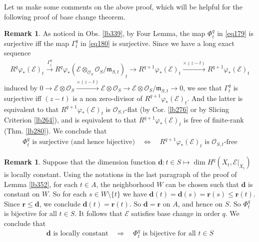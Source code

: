 \documentclass[12pt,b5paper,notitlepage]{report}
\theoremstyle{definition}
\newtheorem{rem}[df]{Remark}
\theoremstyle{plain}
\newcommand{\scr}{\mathscr}
\newcommand{\mbf}{\mathbf}
\newcommand{\mk}{\mathfrak m}
\numberwithin{equation}{section}
\begin{document}
Let us make some comments on the above proof, which will be helpful for the following proof of base change theorem.



\begin{rem}
As noticed in Obs. \ref{lb339}, by Four Lemma, the map $\Phi_t^q$ in \eqref{eq179} is surjective iff the map $\Gamma_t^q$ in \eqref{eq180} is surjective. Since we have a long exact sequence
\begin{align*}
R^q\varphi_*(\scr E)_t\xrightarrow{\Gamma_t^q}R^q\varphi_*(\scr E\otimes_{\scr O_S}\scr O_S/\mk_{S,t})_t \rightarrow R^{q+1}\varphi_*(\scr E)_t\xrightarrow {\times (z-t)}R^{q+1}\varphi_*(\scr E)_t
\end{align*}
induced by $0\rightarrow \scr E\otimes \scr O_S\xrightarrow{\times (z-t)}\scr E\otimes \scr O_S\rightarrow \scr E\otimes \scr O_S/\mk_{S,t}\rightarrow 0$, we see that $\Gamma_t^q$ is surjective iff $(z-t)$ is a non zero-divisor of $R^{q+1}\varphi_*(\scr E)_t$. And the latter is equivalent to that $R^{q+1}\varphi_*(\scr E)_t$ is $\scr O_{S,t}$-flat (by Cor. \ref{lb276} or by Slicing Criterion \ref{lb264}), and is equivalent to that $R^{q+1}\varphi_*(\scr E)_t$ is free of finite-rank (Thm. \ref{lb280}). We conclude that
\begin{align}
\Phi_t^q\text{ is surjective (and hence bijective)}\quad\Longleftrightarrow\quad R^{q+1}\varphi_*(\scr E)_t\text{ is $\scr O_{S,t}$-free}  \label{eq183}
\end{align}
\end{rem}



\begin{rem}
Suppose that the dimension function $\mbf d:t\in S\mapsto \dim H^q(X_t,\scr E|_{X_t})$ is locally constant. Using the notations in the last paragraph of the proof of Lemma \ref{lb352}, for each $t\in A$, the neighborhood $W$ can be chosen such that $\mbf d$ is constant on $W$. So for each $s\in W\setminus\{t\}$ we have $\mbf d(t)=\mbf d(s)=\mbf r (s)\leq\mbf r(t)$. Since $\mbf r\leq\mbf d$, we conclude $\mbf d(t)=\mbf r(t)$. So $\mbf d=\mbf r$ on $A$, and hence on $S$. So $\Phi^q_t$ is bijective for all $t\in S$. It follows that $\scr E$ satisfies base change in order $q$. We conclude that
\begin{align}
\mbf d \text{ is locally constant}\quad\Longrightarrow\quad \Phi_t^q\text{ is bijective for all $t\in S$}   \label{eq184}
\end{align}
\end{rem}
\end{document}
